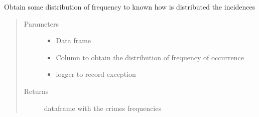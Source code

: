 \documentclass[letterpaper,10pt,english]{sphinxmanual}
\begin{document}
\begin{fulllineitems}
\label{\detokenize{index:dummy_project_utils.get_frequencies}}
\sphinxAtStartPar
{}

\sphinxAtStartPar
Obtain some distribution of frequency to known how is distributed the incidences
\begin{quote}\begin{description}
\item[{Parameters}] \leavevmode\begin{itemize}
\item {} 
\sphinxAtStartPar
{} \textendash{} Data frame

\item {} 
\sphinxAtStartPar
{} \textendash{} Column to obtain the distribution of frequency of occurrence

\item {} 
\sphinxAtStartPar
{} \textendash{} logger to record exception

\end{itemize}

\item[{Returns}] \leavevmode
\sphinxAtStartPar
dataframe with the crimes frequencies

\end{description}\end{quote}

\end{fulllineitems}

\end{document}
